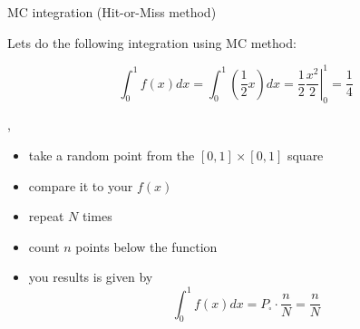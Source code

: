 \begin{slide}[toc=Hit-or-Miss method]{MC integration (Hit-or-Miss method)}
\null\vfill

  Lets do the following integration using MC method:
  
  $$\int_0^1 f(x)dx = \int_0^1 \left(\frac{1}{2}x\right) dx = \left.\frac{1}{2}\frac{x^2}{2}\right|_{0}^{1} = \frac{1}{4}$$

  \twocolumn
  {
    \sep
    \begin{itemize}
     \item take a random point from the $[0,1]\times[0,1]$ square
     \item compare it to your $f(x)$
     \item repeat $N$ times
     \item count $n$ points below the function
     \item you results is given by
     $$\int_0^1 f(x)dx = P_{\square} \cdot \frac{n}{N} = \frac{n}{N}$$
    \end{itemize}
  }
  {
    
  }
  
\vfill\null
\end{slide}


